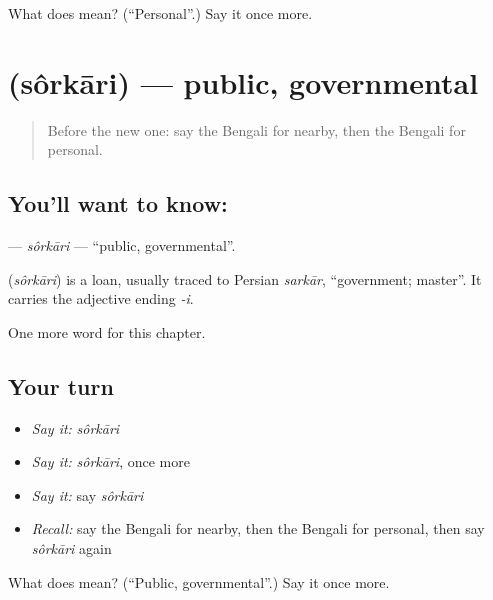 \begin{tcolorbox}[breakable,colback=teal!4,colframe=teal!35!black,title={Before you move on}]
What does  mean? (\textquotedblleft{}Personal\textquotedblright{}.) Say it once more.
\end{tcolorbox}
\section[\texorpdfstring{\bn{সরকারি} (sôrkāri)}{সরকারি (sôrkāri)}]{ (sôrkāri) — public, governmental}

\label{lesson:BN-C193-sorkari}



\begin{quote}
Before the new one: say the Bengali for nearby, then the Bengali for personal.
\end{quote}

\subsection*{You'll want to know: }
\textbf{} — \emph{sôrkāri} — \textquotedblleft{}public, governmental\textquotedblright{}.

\begin{cousinweb}
\textbf{} (\emph{sôrkāri}) is a loan, usually traced to Persian \emph{sarkār}, \textquotedblleft{}government; master\textquotedblright{}. It carries the adjective ending \emph{-i}.
\end{cousinweb}

\begin{grammarlens}[title={What you've built}]
One more word for this chapter.
\end{grammarlens}

\subsection*{Your turn}
\begin{itemize}
\raggedright
  \item \emph{Say it:} \emph{sôrkāri}
  \item \emph{Say it:} \emph{sôrkāri}, once more
  \item \emph{Say it:} say \emph{sôrkāri}
  \item \emph{Recall:} say the Bengali for nearby, then the Bengali for personal, then say \emph{sôrkāri} again
\end{itemize}

\begin{tcolorbox}[breakable,colback=teal!4,colframe=teal!35!black,title={Before you move on}]
What does  mean? (\textquotedblleft{}Public, governmental\textquotedblright{}.) Say it once more.
\end{tcolorbox}
